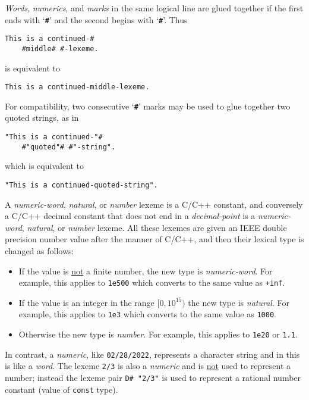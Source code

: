 \documentclass[12pt]{article}
\newcommand{\TT}[1]{{\tt \bfseries #1}}
\newenvironment{indpar}[1][0.3in]%
	{\begin{list}{}%
		     {\setlength{\itemsep}{0in}%
		      \setlength{\topsep}{0in}%
		      \setlength{\parsep}{1ex}%
		      \setlength{\labelwidth}{#1}%
		      \setlength{\leftmargin}{#1}%
		      \addtolength{\leftmargin}{\labelsep}}%
	 \item}%
	{\end{list}}
\begin{document}
{\em Words}, {\em numerics}, and {\em marks}
in the same logical line are glued together if the first
ends with `\TT{\#}' and the second begins with `\TT{\#}'.
Thus
\begin{indpar}\begin{verbatim}
This is a continued-#
    #middle# #-lexeme.
\end{verbatim}\end{indpar}
is equivalent to
\begin{indpar}\begin{verbatim}
This is a continued-middle-lexeme.
\end{verbatim}\end{indpar}
For compatibility, two consecutive `\TT{\#}' marks may be used
to glue together two quoted strings, as in
\begin{indpar}\begin{verbatim}
"This is a continued-"#
    #"quoted"# #"-string".
\end{verbatim}\end{indpar}
which is equivalent to
\begin{indpar}\begin{verbatim}
"This is a continued-quoted-string".
\end{verbatim}\end{indpar}


A {\em numeric-word}, {\em natural}, or {\em number} lexeme
is a C/C++ constant, and
conversely a C/C++ decimal constant
that does not end in a {\em decimal-point}
is a {\em numeric-word}, {\em natural}, or {\em number} lexeme.
All these lexemes are given an IEEE double precision number value
after the manner of C/C++, and then their lexical type is changed
as follows:
\begin{itemize}\label{LEXEME-TYPE-CONVERSION}
\item If the value is \underline{not} a finite number, the
new type is {\em numeric-word}.  For example, this applies to {\tt 1e500}
which converts to the same value as {\tt +inf}.
\item If the value is an integer in the range $[0,10^{15})$ the new
type is {\em natural}.
For example, this applies to {\tt 1e3}
which converts to the same value as {\tt 1000}.
\item Otherwise the new type is {\em number}.
For example, this applies to {\tt 1e20} or {\tt 1.1}.
\end{itemize}

In contrast, a {\em numeric}, like {\tt 02/28/2022},
represents a character string and in this
is like a {\em word}.  The lexeme {\tt 2/3} is also a {\em numeric}
and is \underline{not} used to represent a number; instead
the lexeme pair {\tt D\# "2/3"} is used to represent a rational
number constant (value of {\tt const} type).
\end{document}
